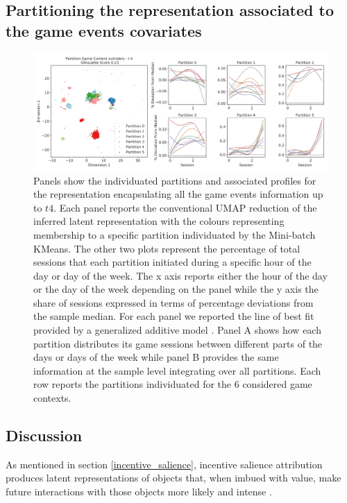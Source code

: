 \subsection{Partitioning the representation associated to the game events covariates}
\begin{figure}[ht]
\includegraphics[width=\textwidth]{images/chapter_4/clust_even.png}
\centering
\caption[Partitions of the representations generated by the RNN architectures from the game events metrics]{Panels show the individuated partitions and associated profiles for the representation encapsulating all the game events information up to $t4$. Each panel reports the conventional UMAP reduction of the inferred latent representation with the colours representing membership to a specific partition individuated by the Mini-batch KMeans. The other two plots represent the percentage of total sessions that each partition initiated during a specific hour of the day or day of the week. The x axis reports either the hour of the day or the day of the week depending on the panel while the y axis the share of sessions expressed in terms of percentage deviations from the sample median. For each panel we reported the line of best fit provided by a generalized additive model \cite{serven2018}. Panel A shows how each partition distributes its game sessions between different parts of the days or days of the week while panel B provides the same information at the sample level integrating over all partitions. Each row reports the partitions individuated for the 6 considered game contexts.}
\label{partition_rnn_even} 
\end{figure}

\subsection{Discussion}
As mentioned in section  \ref{incentive_salience}, incentive salience attribution produces latent representations of objects that, when imbued with value, make future interactions with those objects more likely and intense \cite{berridge1998role,berridge2004motivation}. 

